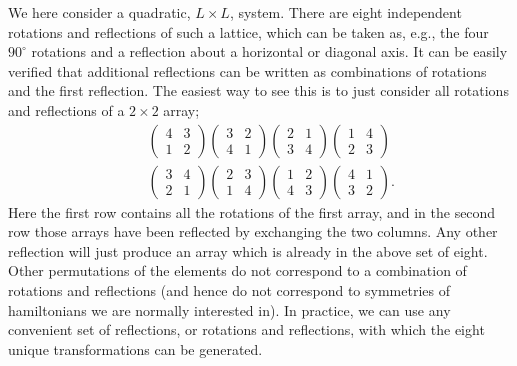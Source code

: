 \documentclass[draft,numberedheadings]{aipproc}
\begin{document}
We here consider a quadratic, $L\times L$, system. There are eight independent rotations and reflections of such a lattice, which can be 
taken as, e.g., the four $90^\circ$ rotations and a reflection about a horizontal or diagonal axis. It can be easily verified that additional reflections 
can be written as combinations of rotations and the first reflection. The easiest way to see this is to just consider all rotations and reflections 
of a $2\times 2$ array;
\begin{eqnarray}
&&\left (\begin{array}{ll}4 & 3
                       \\ 1 & 2\end{array}\right )
  \left (\begin{array}{ll}3 & 2
                       \\ 4 & 1\end{array}\right )
  \left (\begin{array}{ll}2 & 1
                       \\ 3 & 4\end{array}\right )
  \left (\begin{array}{ll}1 & 4
                       \\ 2 & 3\end{array}\right ) \nonumber \\
&&\left (\begin{array}{ll}3 & 4
                       \\ 2 & 1\end{array}\right )
  \left (\begin{array}{ll}2 & 3
                       \\ 1 & 4\end{array}\right )
  \left (\begin{array}{ll}1 & 2
                       \\ 4 & 3\end{array}\right )
  \left (\begin{array}{ll}4 & 1
                       \\ 3 & 2\end{array}\right ).
\end{eqnarray}
Here the first row contains all the rotations of the first array, and in the second row those arrays have been reflected by exchanging
the two columns. Any other reflection will just produce an array which is already in the above set of eight. Other permutations of the elements 
do not correspond to a combination of rotations and reflections (and hence do not correspond to symmetries of hamiltonians we are normally 
interested in). In practice, we can use any convenient set of reflections, or rotations and reflections, with which the eight unique transformations 
can be generated.
\end{document}
